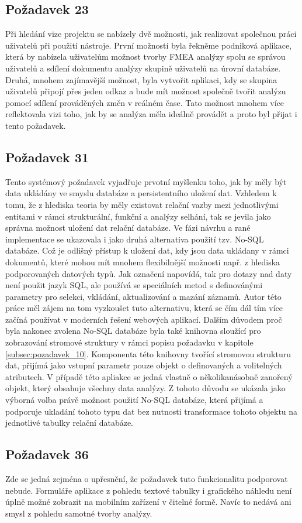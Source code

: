 \subsection{Požadavek 23}
Při hledání vize projektu se nabízely dvě možnosti, jak realizovat společnou práci uživatelů při použití nástroje. První možností byla řekněme podniková aplikace, která by nabízela uživatelům možnost tvorby FMEA analýzy spolu se správou uživatelů a sdílení dokumentu analýzy skupině uživatelů na úrovní databáze. Druhá, mnohem zajímavější možnost, byla vytvořit aplikaci, kdy se skupina uživatelů připojí přes jeden odkaz a bude mít možnost společně tvořit analýzu pomocí sdílení prováděných změn v reálném čase. Tato možnost mnohem více reflektovala vizi toho, jak by se analýza měla ideálně provádět a proto byl přijat i tento požadavek.  

\subsection{Požadavek 31}
Tento systémový požadavek vyjadřuje prvotní myšlenku toho, jak by měly být data ukládány ve smyslu databáze a persistentního uložení dat. Vzhledem k tomu, že z hlediska teoria by měly existovat relační vazby mezi jednotlivými entitami v rámci strukturální, funkční a analýzy selhání, tak se jevila jako správna možnost uložení dat relační databáze. Ve fázi návrhu a rané implementace se ukazovala i jako druhá alternativa použití tzv. No-SQL databáze. Což je odlišný přístup k uložení dat, kdy jsou data ukládany v rámci dokumentů, které mohou mít mnohem flexibilnější možnosti např. z hlediska podporovaných datových typů. Jak označení napovídá, tak pro dotazy nad daty není použit jazyk SQL, ale používá se speciálních metod s definovánými parametry pro selekci, vkládání, aktualizování a mazání záznamů. Autor této práce měl zájem na tom vyzkoušet tuto alternativu, která se čím dál tím více začíná používat v moderních řešení webových aplikací. Dalším důvodem proč byla nakonec zvolena No-SQL databáze byla také knihovna sloužící pro zobrazování stromové struktury v rámci popisu požadavku v kapitole \ref{subsec:pozadavek_10}. Komponenta této knihovny tvořící stromovou strukturu dat, přijímá jako vstupní parametr pouze objekt o definovaných a volitelných atributech. V případě této apliakce se jedná vlastně o několikanásobně zanořený objekt, který obsahuje všechny data analýzy. Z tohoto důvodu se ukázala jako výborná volba právě možnost použití No-SQL databáze, která přijímá a podporuje ukladání tohoto typu dat bez nutnosti transformace tohoto objektu na jednotlivé tabulky relační databáze. 

\subsection{Požadavek 36}
Zde se jedná zejména o upřesnění, že požadavek tuto funkcionalitu podporovat nebude. Formuláře aplikace z pohledu textové tabulky i grafického náhledu není úplně možné zobrazit na mobilním zařízení v čitelné formě. Navíc to nedává ani smysl z pohledu samotné tvorby analýzy. 

